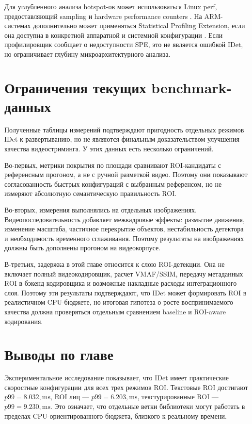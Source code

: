 \documentclass[12pt,a4paper,oneside,openany]{report}
\newcommand{\ms}{\mathrm{ms}}
\begin{document}
Для углубленного анализа hotspot-ов может использоваться Linux perf, предоставляющий sampling и hardware performance counters \cite{linux_perf}. На ARM-системах дополнительно может применяться Statistical Profiling Extension, если она доступна в конкретной аппаратной и системной конфигурации \cite{arm_spe}. Если профилировщик сообщает о недоступности SPE, это не является ошибкой IDet, но ограничивает глубину микроархитектурного анализа.


\section{Ограничения текущих benchmark-данных}

Полученные таблицы измерений подтверждают пригодность отдельных режимов IDet к развертыванию, но не являются финальным доказательством улучшения качества видеостриминга. У этих данных есть несколько ограничений.

Во-первых, метрики покрытия по площади сравнивают ROI-кандидаты с референсным прогоном, а не с ручной разметкой видео. Поэтому они показывают согласованность быстрых конфигураций с выбранным референсом, но не измеряют абсолютную семантическую правильность ROI.

Во-вторых, измерения выполнялись на отдельных изображениях. Видеопоследовательность добавляет межкадровые эффекты: размытие движения, изменение масштаба, частичное перекрытие объектов, нестабильность детектора и необходимость временного сглаживания. Поэтому результаты на изображениях должны быть дополнены прогоном на видеокорпусе.

В-третьих, задержка в этой главе относится к слою ROI-детекции. Она не включает полный видеокодировщик, расчет VMAF/SSIM, передачу метаданных ROI в бэкенд кодировщика и возможные накладные расходы интеграционного слоя. Поэтому эти результаты подтверждают, что IDet может формировать ROI в реалистичном CPU-бюджете, но итоговая гипотеза о росте воспринимаемого качества должна проверяться отдельным сравнением baseline и ROI-aware кодирования.


\section{Выводы по главе}

Экспериментальное исследование показывает, что IDet имеет практические скоростные конфигурации для всех трех режимов ROI. Текстовые ROI достигают $p99=8.032,\ms$, ROI лиц --- $p99=6.203,\ms$, текстурированные ROI --- $p99=9.230,\ms$. Это означает, что отдельные ветки библиотеки могут работать в пределах CPU-ориентированного бюджета, близкого к реальному времени.
\end{document}
